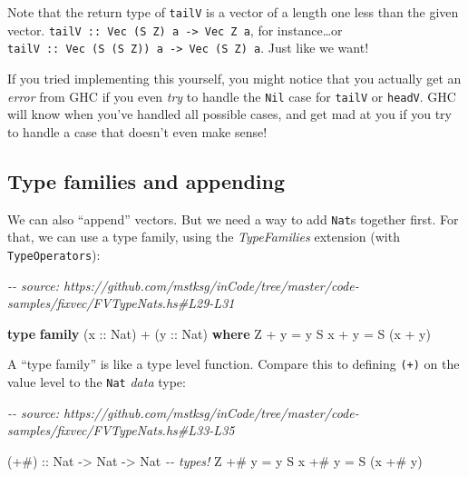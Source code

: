 \documentclass[]{article}
\newenvironment{Shaded}{}{}
\newcommand{\CommentTok}[1]{\textcolor[rgb]{0.38,0.63,0.69}{\textit{#1}}}
\newcommand{\DataTypeTok}[1]{\textcolor[rgb]{0.56,0.13,0.00}{#1}}
\newcommand{\KeywordTok}[1]{\textcolor[rgb]{0.00,0.44,0.13}{\textbf{#1}}}
\newcommand{\NormalTok}[1]{#1}
\newcommand{\OperatorTok}[1]{\textcolor[rgb]{0.40,0.40,0.40}{#1}}
\newcommand{\OtherTok}[1]{\textcolor[rgb]{0.00,0.44,0.13}{#1}}
\begin{document}
Note that the return type of \texttt{tailV} is a vector of a length one less
than the given vector.
\texttt{tailV\ ::\ Vec\ (S\ Z)\ a\ -\textgreater{}\ Vec\ Z\ a}, for
instance\ldots or
\texttt{tailV\ ::\ Vec\ (S\ (S\ Z))\ a\ -\textgreater{}\ Vec\ (S\ Z)\ a}. Just
like we want!

If you tried implementing this yourself, you might notice that you actually get
an \emph{error} from GHC if you even \emph{try} to handle the \texttt{Nil} case
for \texttt{tailV} or \texttt{headV}. GHC will know when you've handled all
possible cases, and get mad at you if you try to handle a case that doesn't even
make sense!

\subsection{Type families and appending}\label{type-families-and-appending}

We can also ``append'' vectors. But we need a way to add \texttt{Nat}s together
first. For that, we can use a type family, using the \emph{TypeFamilies}
extension (with \texttt{TypeOperators}):

\begin{Shaded}
\begin{Highlighting}[]
\CommentTok{{-}{-} source: https://github.com/mstksg/inCode/tree/master/code{-}samples/fixvec/FVTypeNats.hs\#L29{-}L31}

\KeywordTok{type} \KeywordTok{family}\NormalTok{ (}\OtherTok{x ::} \DataTypeTok{Nat}\NormalTok{) }\OperatorTok{+}\NormalTok{ (}\OtherTok{y ::} \DataTypeTok{Nat}\NormalTok{) }\KeywordTok{where}
    \DataTypeTok{\textquotesingle{}Z}   \OperatorTok{+}\NormalTok{ y }\OtherTok{=}\NormalTok{ y}
    \DataTypeTok{\textquotesingle{}S}\NormalTok{ x }\OperatorTok{+}\NormalTok{ y }\OtherTok{=} \DataTypeTok{\textquotesingle{}S}\NormalTok{ (x }\OperatorTok{+}\NormalTok{ y)}
\end{Highlighting}
\end{Shaded}

A ``type family'' is like a type level function. Compare this to defining
\texttt{(+)} on the value level to the \texttt{Nat} \emph{data} type:

\begin{Shaded}
\begin{Highlighting}[]
\CommentTok{{-}{-} source: https://github.com/mstksg/inCode/tree/master/code{-}samples/fixvec/FVTypeNats.hs\#L33{-}L35}

\OtherTok{(+\#) ::} \DataTypeTok{Nat} \OtherTok{{-}\textgreater{}} \DataTypeTok{Nat} \OtherTok{{-}\textgreater{}} \DataTypeTok{Nat}       \CommentTok{{-}{-} types!}
\DataTypeTok{Z}   \OperatorTok{+\#}\NormalTok{ y }\OtherTok{=}\NormalTok{ y}
\DataTypeTok{S}\NormalTok{ x }\OperatorTok{+\#}\NormalTok{ y }\OtherTok{=} \DataTypeTok{S}\NormalTok{ (x }\OperatorTok{+\#}\NormalTok{ y)}
\end{Highlighting}
\end{Shaded}
\end{document}
